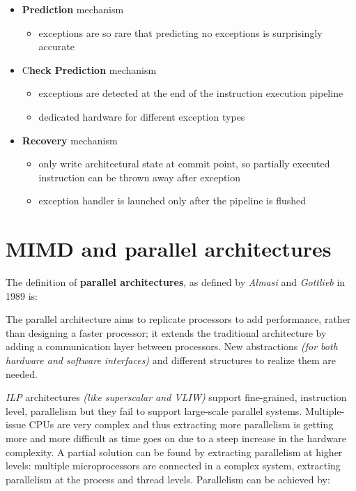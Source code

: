 \documentclass[english]{article}
\begin{document}
\begin{itemize}
  \item \textbf{Prediction} mechanism
        \begin{itemize}[label=\(\rightarrow\)]
          \item exceptions are so rare that predicting no exceptions is surprisingly accurate
        \end{itemize}
  \item C\textbf{heck Prediction} mechanism
        \begin{itemize}[label=\(\rightarrow\)]
          \item exceptions are detected at the end of the instruction execution pipeline
          \item dedicated hardware for different exception types
        \end{itemize}
  \item \textbf{Recovery} mechanism
        \begin{itemize}[label=\(\rightarrow\)]
          \item only write architectural state at commit point, so partially executed instruction can be thrown away after exception
          \item exception handler is launched only after the pipeline is flushed
        \end{itemize}
\end{itemize}

\clearpage

\section{MIMD and parallel architectures}
\label{sec:mimd}

The definition of \textbf{parallel architectures}, as defined by \textit{Almasi} and \textit{Gottlieb} in 1989 is:


The parallel architecture aims to replicate processors to add performance, rather than designing a faster processor;
it extends the traditional architecture by adding a communication layer between processors.
New abstractions \textit{(for both hardware and software interfaces)} and different structures to realize them are needed.

\bigskip
\textit{ILP} architectures \textit{(like superscalar and VLIW)} support fine-grained, instruction level, parallelism but they fail to support large-scale parallel systems.
Multiple-issue CPUs are very complex and thus extracting more parallelism is getting more and more difficult as time goes on due to a steep increase in the hardware complexity.
A partial solution can be found by extracting parallelism at higher levels: multiple microprocessors are connected in a complex system, extracting parallelism at the process and thread levels.
Parallelism can be achieved by:
\end{document}
